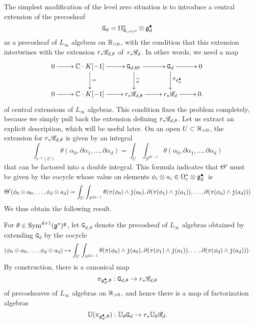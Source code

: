 The simplest modification of the level zero situation is to introduce a central extension of the precosheaf
\[
\mathtt{G}_d = \Omega^*_{\mathbb R_{>0},c} \otimes \mathfrak g^\bullet_d
\] 
as a precosheaf of $L_\infty$ algebras on $\mathbb R_{>0}$,
with the condition that this extension intertwines with the extension $r_*\mathscr G_{d,\theta}$ of~$r_* \mathscr G_{d}$.
In other words, we need a map 
\[
\xymatrix{
0 \ar[r] & \CC \cdot K [-1]  \ar[d]^{=} \ar[r] & \mathtt{G}_{d,\Theta'} \ar[d]^{\Hat{\pi}} \ar[r] & \mathtt{G}_d \ar[d]^{\pi_{\fg^\bullet_d}} \ar[r] & 0 \\
0 \ar[r] & \CC \cdot K [-1] \ar[r] & r_*\sG_{d,\theta} \ar[r] & r_* \sG_{d} \ar[r] & 0 .
}
\]
of central extensions of $L_\infty$ algebras.
This condition fixes the problem completely, 
because we simply pull back the extension defining $r_*\mathscr G_{d,\theta}$.
Let us extract an explicit description,
which will be useful later.
On an open $U \subset \mathbb R_{>0}$, the extension for $r_*\mathscr G_{d,\theta}$ is given by an integral
\[
\int_{r^{-1}(U)} \theta(\alpha_0,\partial \alpha_1,\ldots,\partial \alpha_d) = \int_U \int_{S^{2d-1}} \theta(\alpha_0,\partial \alpha_1,\ldots,\partial \alpha_d)
\]
that can be factored into a double integral. 
This formula indicates that $\Theta'$ must be given by the cocycle whose value on elements $\phi_i \otimes a_i \in \Omega^*_c \otimes \mathfrak g^\bullet_d$~is
\begin{align*}
\Theta'(\phi_0 \otimes a_0, \ldots, \phi_d \otimes a_d)
&= \int_U \int_{S^{2d-1}} \theta(\pi(\phi_0) \wedge {\mathtt{j}}(a_0),\partial (\pi(\phi_1) \wedge {\mathtt{j}}(a_1)),\ldots,\partial(\pi(\phi_d) \wedge {\mathtt{j}}(a_d))) \\
\end{align*}
We thus obtain the following result.

\begin{lem} 
For $\theta \in {\rm Sym}^{d+1}(\mathfrak g^*)^\mathfrak g$,
let $\mathtt{G}_{d,\theta}$ denote the precosheaf of $L_\infty$ algebras obtained by extending $\mathtt{G}_d$ by the cocycle
\[
(\phi_0 \otimes a_0, \ldots, \phi_d \otimes a_d) \mapsto \int_U \int_{S^{2d-1}} \theta(\pi(\phi_0) \wedge {\mathtt{j}}(a_0),\partial (\pi(\phi_1) \wedge {\mathtt{j}}(a_1)),\ldots,\partial(\pi(\phi_d) \wedge {\mathtt{j}}(a_d))).
\]
By construction, there is a canonical map 
\[
\pi_{\mathfrak g^\bullet_d,\theta}: \mathtt{G}_{d,\theta} \to r_* \mathscr G_{d,\theta}
\]
of precosheaves of $L_\infty$ algebras on $\mathbb R_{>0}$, 
and hence there is a map of factorization algebras
\[
\mathbb U(\pi_{\mathfrak g^\bullet_d,\theta}): \mathbb U_{\theta} \mathtt{G}_d \to r_* \mathbb U_\theta \mathscr G_d.
\]
\end{lem}

